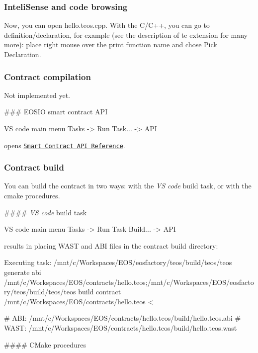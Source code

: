 \subsubsection*{Inteli\+Sense and code browsing}

Now, you can open {\ttfamily hello.\+teos.\+cpp}. With the {\ttfamily C/\+C++}, you can go to definition/declaration, for example (see the description of te extension for many more)\+: place right mouse over the {\ttfamily print} function name and chose {\ttfamily Pick Declaration}.

\subsubsection*{Contract compilation}

Not implemented yet.

\#\#\# E\+O\+S\+IO smart contract A\+PI 
\begin{DoxyCode}
VS code main menu Tasks -> Run Task... -> API
\end{DoxyCode}
 opens \href{#https://eosio.github.io/eos/group__contractdev.html}{\tt Smart Contract A\+PI Reference}.

\subsubsection*{Contract build}

You can build the contract in two ways\+: with the {\itshape VS code} build task, or with the cmake procedures.

\#\#\#\# {\itshape VS code} build task 
\begin{DoxyCode}
VS code main menu Tasks -> Run Task Build... -> API
\end{DoxyCode}
 results in placing W\+A\+ST and A\+BI files in the contract build directory\+: 
\begin{DoxyCode}
Executing task: /mnt/c/Workspaces/EOS/eosfactory/teos/build/teos/teos generate abi
       /mnt/c/Workspaces/EOS/contracts/hello.teos;/mnt/c/Workspaces/EOS/eosfactory/teos/build/teos/teos build contract
       /mnt/c/Workspaces/EOS/contracts/hello.teos <

#              ABI: /mnt/c/Workspaces/EOS/contracts/hello.teos/build/hello.teos.abi
#             WAST: /mnt/c/Workspaces/EOS/contracts/hello.teos/build/hello.teos.wast
\end{DoxyCode}
 \#\#\#\# C\+Make procedures 


